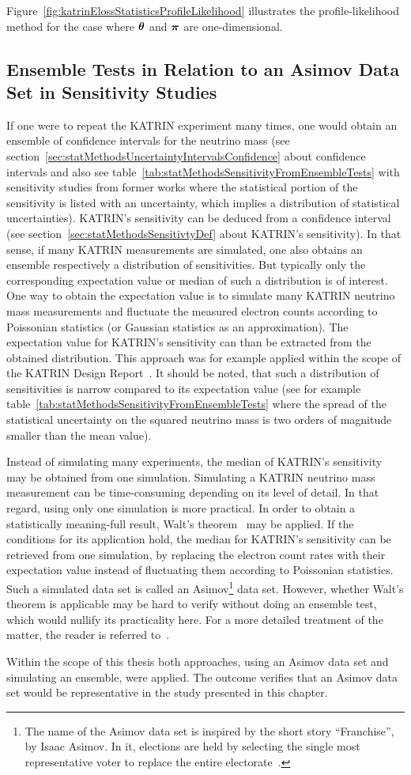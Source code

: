 Figure~\ref{fig:katrinElossStatisticsProfileLikelihood} illustrates the profile-likelihood method for the case where $\boldsymbol{\mathbf{\theta}}$ and $\boldsymbol{\mathbf{\pi}}$ are one-dimensional.

\subsection{Ensemble Tests in Relation to an Asimov Data Set in Sensitivity Studies}
\label{sec:katrinElossStatisticsAsimov}
If one were to repeat the KATRIN experiment many times, one would obtain an ensemble of confidence intervals for the neutrino mass (see section~\ref{sec:statMethodsUncertaintyIntervalsConfidence} about confidence intervals and also see table~\ref{tab:statMethodsSensitivityFromEnsembleTests} with sensitivity studies from former works where the statistical portion of the sensitivity is listed with an uncertainty, which implies a distribution of statistical uncertainties). KATRIN's sensitivity can be deduced from a confidence interval (see section~\ref{sec:statMethodsSensitivtyDef} about KATRIN's sensitivity). In that sense, if many KATRIN measurements are simulated, one also obtains an ensemble respectively a distribution of sensitivities. But typically only the corresponding expectation value or median of such a distribution is of interest. One way to obtain the expectation value is to simulate many KATRIN neutrino mass measurements and fluctuate the measured electron counts according to Poissonian statistics (or Gaussian statistics as an approximation). The expectation value for KATRIN's sensitivity can than be extracted from the obtained distribution. This approach was for example applied within the scope of the KATRIN Design Report~\cite{Angrik:2005ep}. It should be noted, that such a distribution of sensitivities is narrow compared to its expectation value (see for example table~\ref{tab:statMethodsSensitivityFromEnsembleTests} where the spread of the statistical uncertainty on the squared neutrino mass is two orders of magnitude smaller than the mean value).

Instead of simulating many experiments, the median of KATRIN's sensitivity may be obtained from one simulation. Simulating a KATRIN neutrino mass measurement can be time-consuming depending on its level of detail. In that regard, using only one simulation is more practical. In order to obtain a statistically meaning-full result, Walt's theorem~\cite{Wald1944} may be applied. If the conditions for its application hold, the median for KATRIN's sensitivity can be retrieved from one simulation, by replacing the electron count rates with their expectation value instead of fluctuating them according to Poissonian statistics. Such a simulated data set is called an Asimov\footnote{The name of the Asimov data set is inspired by the short story ``Franchise'', by Isaac Asimov. In it, elections are held by selecting the single most representative voter to replace the entire electorate~\cite{Cowan2011}.} data set. However, whether Walt's theorem is applicable may be hard to verify without doing an ensemble test, which would nullify its practicality here. For a more detailed treatment of the matter, the reader is referred to~\cite{Cowan2011}.

Within the scope of this thesis both approaches, using an Asimov data set and simulating an ensemble, were applied. The outcome verifies that an Asimov data set would be representative in the study presented in this chapter.
